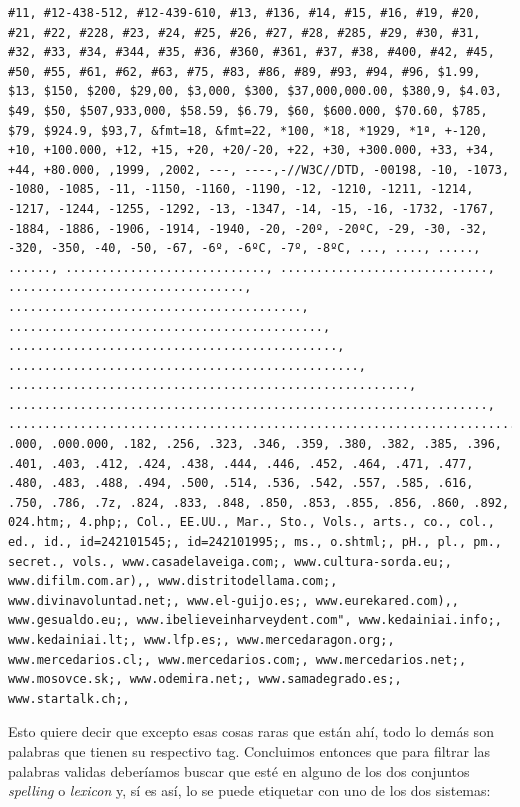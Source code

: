 \begin{Verbatim}[breaklines=true, breakanywhere=true]
#11, #12-438-512, #12-439-610, #13, #136, #14, #15, #16, #19, #20, #21, #22, #228, #23, #24, #25, #26, #27, #28, #285, #29, #30, #31, #32, #33, #34, #344, #35, #36, #360, #361, #37, #38, #400, #42, #45, #50, #55, #61, #62, #63, #75, #83, #86, #89, #93, #94, #96, $1.99, $13, $150, $200, $29,00, $3,000, $300, $37,000,000.00, $380,9, $4.03, $49, $50, $507,933,000, $58.59, $6.79, $60, $600.000, $70.60, $785, $79, $924.9, $93,7, &fmt=18, &fmt=22, *100, *18, *1929, *1ª, +-120, +10, +100.000, +12, +15, +20, +20/-20, +22, +30, +300.000, +33, +34, +44, +80.000, ,1999, ,2002, ---, ----,-//W3C//DTD, -00198, -10, -1073, -1080, -1085, -11, -1150, -1160, -1190, -12, -1210, -1211, -1214, -1217, -1244, -1255, -1292, -13, -1347, -14, -15, -16, -1732, -1767, -1884, -1886, -1906, -1914, -1940, -20, -20º, -20ºC, -29, -30, -32, -320, -350, -40, -50, -67, -6º, -6ºC, -7º, -8ºC, ..., ...., ....., ......, ............................, ............................., ................................., ........................................., ............................................, .............................................., ................................................., ........................................................, ..................................................................., ......................................................................., .000, .000.000, .182, .256, .323, .346, .359, .380, .382, .385, .396, .401, .403, .412, .424, .438, .444, .446, .452, .464, .471, .477, .480, .483, .488, .494, .500, .514, .536, .542, .557, .585, .616, .750, .786, .7z, .824, .833, .848, .850, .853, .855, .856, .860, .892, 024.htm;, 4.php;, Col., EE.UU., Mar., Sto., Vols., arts., co., col., ed., id., id=242101545;, id=242101995;, ms., o.shtml;, pH., pl., pm., secret., vols., www.casadelaveiga.com;, www.cultura-sorda.eu;, www.difilm.com.ar),, www.distritodellama.com;, www.divinavoluntad.net;, www.el-guijo.es;, www.eurekared.com),, www.gesualdo.eu;, www.ibelieveinharveydent.com", www.kedainiai.info;, www.kedainiai.lt;, www.lfp.es;, www.mercedaragon.org;, www.mercedarios.cl;, www.mercedarios.com;, www.mercedarios.net;, www.mosovce.sk;, www.odemira.net;, www.samadegrado.es;, www.startalk.ch;,
\end{Verbatim}

Esto quiere decir que excepto esas cosas raras que están ahí, todo lo
demás son palabras que tienen su respectivo tag.
Concluimos entonces que para filtrar las palabras validas deberíamos buscar que esté en alguno de los dos conjuntos \emph{spelling} o \emph{lexicon} y, sí es así, lo se puede etiquetar con uno de los dos sistemas:

